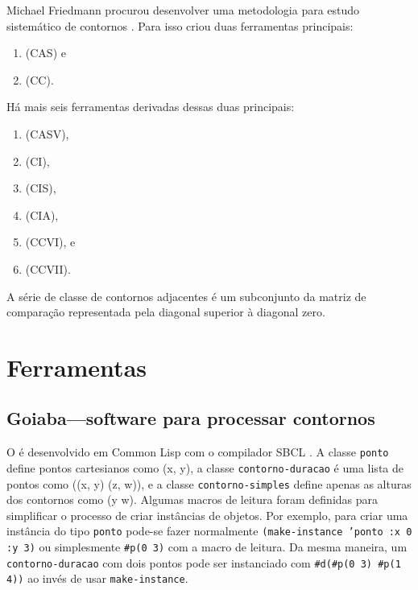 Michael Friedmann procurou desenvolver uma metodologia para estudo
sistemático de contornos \cite{friedmann85:methodology}. Para isso
criou duas ferramentas principais:

\begin{enumerate}
\item {} (CAS) e
\item {} (CC).
\end{enumerate}

Há mais seis ferramentas derivadas dessas duas principais:

\begin{enumerate}
\item {} (CASV),
\item {} (CI),
\item {} (CIS),
\item {} (CIA),
\item {} (CCVI), e
\item {} (CCVII).
\end{enumerate}

A série de classe de contornos adjacentes é um subconjunto da matriz
de comparação representada pela diagonal superior à diagonal zero.

\chapter{Ferramentas}
\label{cha:ferramentas}

\section{Goiaba---software para processar contornos}
\label{sec:goiaba-software-para}

O \goiaba{} é desenvolvido em Common Lisp com o compilador SBCL
\cite{team07:sbcl}. A classe \texttt{ponto} define pontos cartesianos
como (x, y), a classe \texttt{contorno-duracao} é uma lista de pontos
como ((x, y) (z, w)), e a classe \texttt{contorno-simples} define
apenas as alturas dos contornos como (y w). Algumas macros de leitura
foram definidas para simplificar o processo de criar instâncias de
objetos. Por exemplo, para criar uma instância do tipo \texttt{ponto}
pode-se fazer normalmente \texttt{(make-instance 'ponto :x 0 :y 3)} ou
simplesmente \verb!#p(0 3)! com a macro de leitura. Da mesma maneira,
um \texttt{contorno-duracao} com dois pontos pode ser instanciado com
\verb!#d(#p(0 3) #p(1 4))! ao invés de usar \texttt{make-instance}.

